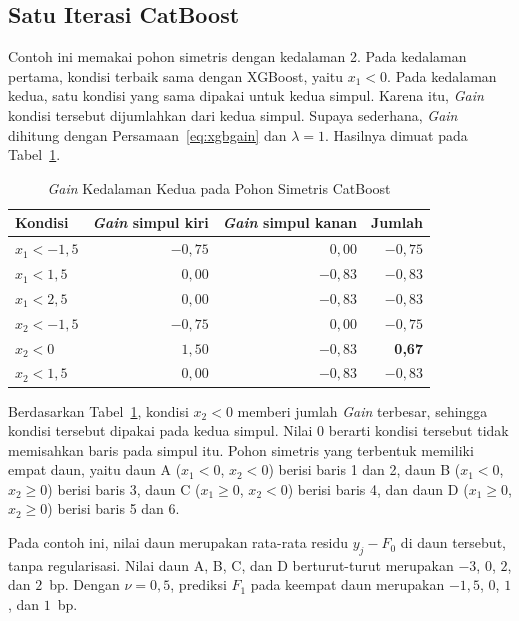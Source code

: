 \subsection{Satu Iterasi CatBoost}
Contoh ini memakai pohon simetris dengan kedalaman 2. Pada kedalaman pertama,
kondisi terbaik sama dengan XGBoost, yaitu $x_1 < 0$. Pada kedalaman kedua,
satu kondisi yang sama dipakai untuk kedua simpul. Karena itu,
\textit{Gain} kondisi tersebut dijumlahkan dari kedua simpul. Supaya
sederhana, \textit{Gain} dihitung dengan Persamaan~\eqref{eq:xgbgain} dan
$\lambda = 1$. Hasilnya dimuat pada Tabel~\ref{tab:man-cat}.

\begin{table}[htbp]
  \caption{\textit{Gain} Kedalaman Kedua pada Pohon Simetris CatBoost}
  \label{tab:man-cat}
  \centering
  \begingroup
  \footnotesize
  \setlength{\tabcolsep}{6pt}
  \begin{tabular}{|l|r|r|r|}
    \hline
    \textbf{Kondisi} & \textbf{\textit{Gain} simpul kiri} & \textbf{\textit{Gain} simpul kanan} & \textbf{Jumlah} \\
    \hline
    $x_1 < -1{,}5$ & $-0{,}75$ & $0{,}00$ & $-0{,}75$ \\
    $x_1 < 1{,}5$ & $0{,}00$ & $-0{,}83$ & $-0{,}83$ \\
    $x_1 < 2{,}5$ & $0{,}00$ & $-0{,}83$ & $-0{,}83$ \\
    $x_2 < -1{,}5$ & $-0{,}75$ & $0{,}00$ & $-0{,}75$ \\
    $x_2 < 0$ & $1{,}50$ & $-0{,}83$ & \textbf{0,67} \\
    $x_2 < 1{,}5$ & $0{,}00$ & $-0{,}83$ & $-0{,}83$ \\
    \hline
  \end{tabular}
  \endgroup
\end{table}

Berdasarkan Tabel~\ref{tab:man-cat}, kondisi $x_2 < 0$ memberi jumlah
\textit{Gain} terbesar, sehingga kondisi tersebut dipakai pada kedua simpul.
Nilai 0 berarti kondisi tersebut tidak memisahkan baris pada simpul itu.
Pohon simetris yang terbentuk memiliki empat daun, yaitu daun A ($x_1 < 0$,
$x_2 < 0$) berisi baris 1 dan 2, daun B ($x_1 < 0$, $x_2 \ge 0$) berisi baris
3, daun C ($x_1 \ge 0$, $x_2 < 0$) berisi baris 4, dan daun D ($x_1 \ge 0$,
$x_2 \ge 0$) berisi baris 5 dan 6.

Pada contoh ini, nilai daun merupakan rata-rata residu $y_j - F_0$ di daun
tersebut, tanpa regularisasi. Nilai daun A, B, C, dan D berturut-turut
merupakan $-3$, $0$, $2$, dan $2$~bp. Dengan $\nu = 0{,}5$, prediksi
$F_1$ pada keempat daun merupakan $-1{,}5$, $0$, $1$, dan $1$~bp.

